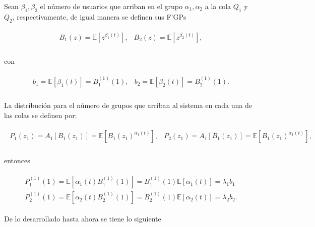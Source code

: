 \documentclass{article}
\newcommand{\esp}{\mathbb{E}}
\numberwithin{equation}{section}
\begin{document}
Sean $\beta_{1},\beta_{2}$ el n\'umero de usuarios que arriban en el grupo $\alpha_{1},\alpha_{2}$ a la cola $Q_{1}$ y $Q_{2}$, respectivamente, de igual manera se definen sus F'GPs

\begin{eqnarray}
\begin{array}{cc}
B_{1}\left(z\right)=\esp\left[z^{\beta_{1}\left(t\right)}\right],&
B_{2}\left(z\right)=\esp\left[z^{\beta_{2}\left(t\right)}\right],\\
\end{array}
\end{eqnarray}

con

\begin{eqnarray}
\begin{array}{cc}
b_{1}=\esp\left[\beta_{1}\left(t\right)\right]=B_{1}^{(1)}\left(1\right),&
b_{2}=\esp\left[\beta_{2}\left(t\right)\right]=B_{2}^{(1)}\left(1\right).\\
\end{array}
\end{eqnarray}

La distribuci\'on para el n\'umero de grupos que arriban al sistema en cada una de las colas se definen por:

\begin{eqnarray}
\begin{array}{cc}
P_{1}\left(z_{1}\right)=A_{1}\left[B_{1}\left(z_{1}\right)\right]=\esp\left[B_{1}\left(z_{1}\right)^{\alpha_{1}\left(t\right)}\right],& P_{2}\left(z_{1}\right)=A_{1}\left[B_{1}\left(z_{1}\right)\right]=\esp\left[B_{1}\left(z_{1}\right)^{\alpha_{1}\left(t\right)}\right],\\
\end{array}
\end{eqnarray}

entonces

\begin{eqnarray}
\begin{array}{l}
P_{1}^{(1)}\left(1\right)=\esp\left[\alpha_{1}\left(t\right)B_{1}^{(1)}\left(1\right)\right]=B_{1}^{(1)}\left(1\right)\esp\left[\alpha_{1}\left(t\right)\right]=\lambda_{1}b_{1}\\
P_{2}^{(1)}\left(1\right)=\esp\left[\alpha_{2}\left(t\right)B_{2}^{(1)}\left(1\right)\right]=B_{2}^{(1)}\left(1\right)\esp\left[\alpha_{2}\left(t\right)\right]=\lambda_{2}b_{2}.
\end{array}
\end{eqnarray}

De lo desarrollado hasta ahora se tiene lo siguiente
\end{document}
